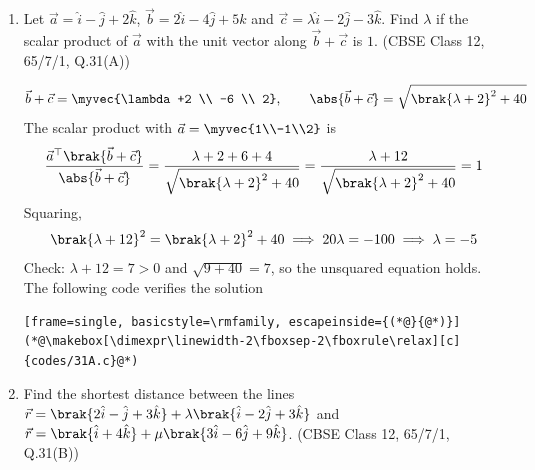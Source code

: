 \begin{enumerate}[label=\thesubsection.\arabic*, ref=\thesubsection.\theenumi]
\item
Let $\vec{a} = \hat{i} - \hat{j} + 2\hat{k}$, $\vec{b} = 2\hat{i} - 4\hat{j} + 5\hat{k}$ and $\vec{c} = \lambda\hat{i} - 2\hat{j} - 3\hat{k}$. Find $\lambda$ if the scalar product of $\vec{a}$ with the unit vector along $\vec{b} + \vec{c}$ is $1$.
\hfill (CBSE Class 12, 65/7/1, Q.31(A))

\solution
\begin{align}
	\vec{b} + \vec{c} = \myvec{\lambda+2 \\ -6 \\ 2}, \qquad \abs{\vec{b}+\vec{c}} = \sqrt{\brak{\lambda+2}^2 + 40}
\end{align}
The scalar product with $\vec{a} = \myvec{1\\-1\\2}$ is
\begin{align}
	\frac{\vec{a}^{\top}\brak{\vec{b}+\vec{c}}}{\abs{\vec{b}+\vec{c}}} = \frac{\lambda + 2 + 6 + 4}{\sqrt{\brak{\lambda+2}^2 + 40}} = \frac{\lambda+12}{\sqrt{\brak{\lambda+2}^2+40}} = 1
\end{align}
Squaring,
\begin{align}
	\brak{\lambda+12}^2 = \brak{\lambda+2}^2 + 40 \implies 20\lambda = -100 \implies \lambda = -5
\end{align}
Check: $\lambda + 12 = 7 > 0$ and $\sqrt{9 + 40} = 7$, so the unsquared equation holds.
The following code verifies the solution
\begin{lstlisting}[frame=single, basicstyle=\rmfamily, escapeinside={(*@}{@*)}]
(*@\makebox[\dimexpr\linewidth-2\fboxsep-2\fboxrule\relax][c]{codes/31A.c}@*)
\end{lstlisting}

\item
Find the shortest distance between the lines $\vec{r} = \brak{2\hat{i} - \hat{j} + 3\hat{k}} + \lambda\brak{\hat{i} - 2\hat{j} + 3\hat{k}}$ and $\vec{r} = \brak{\hat{i} + 4\hat{k}} + \mu\brak{3\hat{i} - 6\hat{j} + 9\hat{k}}$.
\hfill (CBSE Class 12, 65/7/1, Q.31(B))


\end{enumerate}
